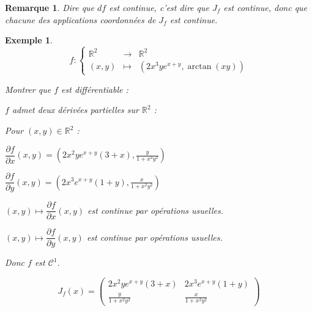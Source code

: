 \documentclass[a4paper,12pt]{book}
\newtheorem{Exe}{Exemple}[section]
\newtheorem{Rem}{Remarque}[section]
\def\R{\mathbb{R}}
\begin{document}
\begin{Rem}
Dire que $df$ est continue, c'est dire que $J_f$ est continue, donc que chacune des applications coordonnées de $J_f$ est continue.
\end{Rem}
\begin{Exe}
$$f:\left\{\begin{array}{rcl} \R^2 & \to & \R^2 \\ (x,y) & \mapsto & (2x^3ye^{x+y},\arctan(xy))\end{array}\right.$$
\par Montrer que $f$ est différentiable :
\par $f$ admet deux dérivées partielles sur $\R^2$ :
\par Pour $(x,y)\in\R^2$ :
\par $\dfrac{\partial f}{\partial x}(x,y)=\left(2x^2ye^{x+y}(3+x), \frac{y}{1+x^2y^2}\right)$
\par $\dfrac{\partial f}{\partial y}(x,y) = \left(2x^3e^{x+y}(1+y), \frac{x}{1+x^2y^2}\right)$
\par $(x, y)\mapsto \dfrac{\partial f}{\partial x}(x,y)$ est continue par opérations usuelles.
\par $(x, y)\mapsto \dfrac{\partial f}{\partial y}(x,y)$ est continue par opérations usuelles.
\par Donc $f$ est $\mathcal{C}^1$.
\par $$J_f(x) = \begin{pmatrix}2x^2ye^{x+y}(3+x) & 2x^3e^{x+y}(1+y) \\ \frac{y}{1+x^2y^2} & \frac{x}{1+x^2y^2} \end{pmatrix}$$
\end{Exe}
\end{document}
